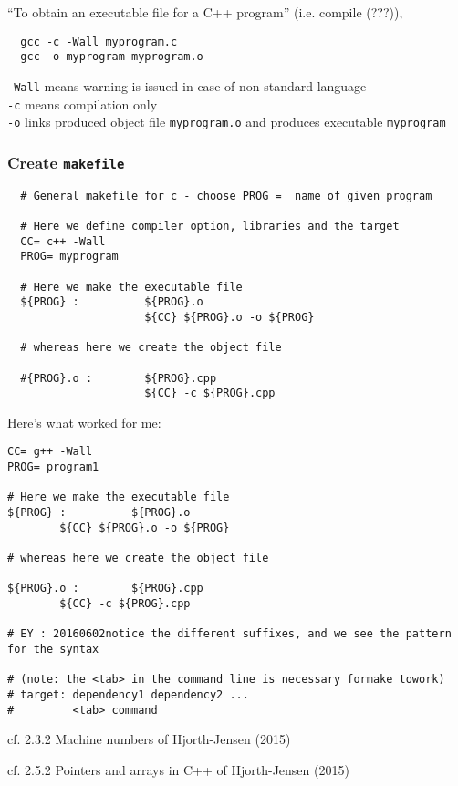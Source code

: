\documentclass[10pt]{amsart}
\begin{document}
\begin{multicols*}{2}
``To obtain an executable file for a C++ program'' (i.e. compile (???)), 
\begin{lstlisting}
  gcc -c -Wall myprogram.c
  gcc -o myprogram myprogram.o
\end{lstlisting}
\verb|-Wall| means warning is issued in case of non-standard language \\
\verb|-c| means compilation only \\
\verb|-o| links produced object file \verb|myprogram.o| and produces executable \verb|myprogram|

\subsubsection{Create \verb|makefile|}

\begin{lstlisting}
  # General makefile for c - choose PROG =  name of given program
  
  # Here we define compiler option, libraries and the target
  CC= c++ -Wall
  PROG= myprogram

  # Here we make the executable file
  ${PROG} :          ${PROG}.o
                     ${CC} ${PROG}.o -o ${PROG}

  # whereas here we create the object file

  #{PROG}.o :        ${PROG}.cpp
                     ${CC} -c ${PROG}.cpp
\end{lstlisting}

Here's what worked for me:
\begin{lstlisting}
CC= g++ -Wall
PROG= program1

# Here we make the executable file
${PROG} :          ${PROG}.o
        ${CC} ${PROG}.o -o ${PROG}

# whereas here we create the object file

${PROG}.o :        ${PROG}.cpp
        ${CC} -c ${PROG}.cpp

# EY : 20160602notice the different suffixes, and we see the pattern for the syntax

# (note: the <tab> in the command line is necessary formake towork)
# target: dependency1 dependency2 ...
#         <tab> command
\end{lstlisting}


cf. 2.3.2 Machine numbers of Hjorth-Jensen (2015) \cite{Hjor2015}


cf. 2.5.2 Pointers and arrays in C++ of Hjorth-Jensen (2015) \cite{Hjor2015}


\end{multicols*}
\end{document}
